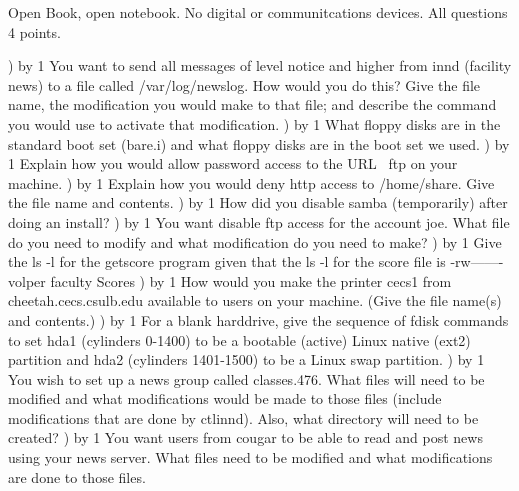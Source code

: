 
\parindent=0in
\nopagenumbers
\newcount\quesno
{}
\def\ques{\number\quesno) \advance\quesno by 1}
\def\aspace{\vskip 1.5in}

Open Book, open notebook. No digital or communitcations devices.
All questions 4 points.

\ques
You want to send all messages of level {\ltt{}notice} and higher
from {\ltt{}innd} (facility {\ltt{}news})
to a file called {\ltt{}/var/log/newslog}.
How would you do this?
Give the file name, the modification you would make to that file;
and describe the command you would use to activate that modification.
\vskip 1.0in
\ques
What floppy disks are in the standard boot set ({\ltt{}bare.i})
and what floppy disks are in the boot set we used.
\vskip 0.8in
\ques
Explain how you would allow password access to the URL
{\ltt{}~ftp} on your machine.
\vskip 1.5in
\ques
Explain how you would deny http access to {\ltt{}/home/share}.
Give the file name and contents.
\vskip 2.3in
\vfill\eject
\ques
How did you disable samba (temporarily) after doing an install?
\vskip 0.6in
\ques
You want disable ftp access for the account {\ltt{}joe}.
What file do you need to modify and what modification do you need to make?
\vskip 1.0in
\ques
Give the {\ltt{}ls -l} for the {\ltt{}getscore} program
given that the {\ltt{}ls -l} for the score file is
\hfill\break
{\ltt{} -rw------- volper faculty   Scores}
\vskip 0.6in
\ques
How would you make the printer {\ltt{}cecs1} from
{\ltt{}cheetah.cecs.csulb.edu} available to users on your machine.
(Give the file name(s) and contents.)
\vskip 1.0in
\ques
For a blank harddrive,
give the sequence of {\ltt{}fdisk} commands to
set {\ltt{}hda1} (cylinders 0-1400)
to be a bootable (active) Linux native (ext2) partition
and {\ltt{}hda2} (cylinders 1401-1500)
to be a Linux swap partition.
\vfill\eject
\ques
You wish to set up a news group called {\ltt{}classes.476}.
What files will need to be modified
and what modifications would be made to those files
(include modifications that are done by {\ltt{}ctlinnd}).
Also, what directory will need to be created?
\vskip 2.7in
\ques
You want users from {\ltt{}cougar} to be able to read and
post news using your news server.
What files need to be modified and what modifications are done
to those files.
\vskip 2.2in
